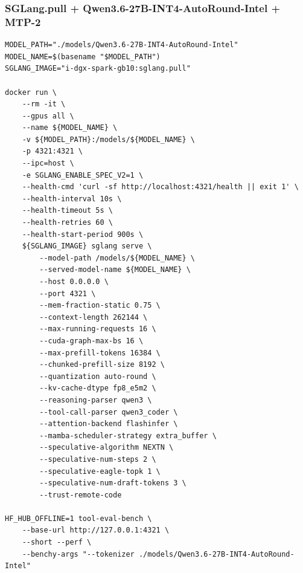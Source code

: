 \documentclass{article}
\begin{document}
\subsubsection{SGLang.pull + Qwen3.6-27B-INT4-AutoRound-Intel + MTP-2}
\begin{lstlisting}
MODEL_PATH="./models/Qwen3.6-27B-INT4-AutoRound-Intel"
MODEL_NAME=$(basename "$MODEL_PATH")
SGLANG_IMAGE="i-dgx-spark-gb10:sglang.pull"

docker run \
    --rm -it \
    --gpus all \
    --name ${MODEL_NAME} \
    -v ${MODEL_PATH}:/models/${MODEL_NAME} \
    -p 4321:4321 \
    --ipc=host \
    -e SGLANG_ENABLE_SPEC_V2=1 \
    --health-cmd 'curl -sf http://localhost:4321/health || exit 1' \
    --health-interval 10s \
    --health-timeout 5s \
    --health-retries 60 \
    --health-start-period 900s \
    ${SGLANG_IMAGE} sglang serve \
        --model-path /models/${MODEL_NAME} \
        --served-model-name ${MODEL_NAME} \
        --host 0.0.0.0 \
        --port 4321 \
        --mem-fraction-static 0.75 \
        --context-length 262144 \
        --max-running-requests 16 \
        --cuda-graph-max-bs 16 \
        --max-prefill-tokens 16384 \
        --chunked-prefill-size 8192 \
        --quantization auto-round \
        --kv-cache-dtype fp8_e5m2 \
        --reasoning-parser qwen3 \
        --tool-call-parser qwen3_coder \
        --attention-backend flashinfer \
        --mamba-scheduler-strategy extra_buffer \
        --speculative-algorithm NEXTN \
        --speculative-num-steps 2 \
        --speculative-eagle-topk 1 \
        --speculative-num-draft-tokens 3 \
        --trust-remote-code

HF_HUB_OFFLINE=1 tool-eval-bench \
    --base-url http://127.0.0.1:4321 \
    --short --perf \
    --benchy-args "--tokenizer ./models/Qwen3.6-27B-INT4-AutoRound-Intel"
\end{lstlisting}
\end{document}
